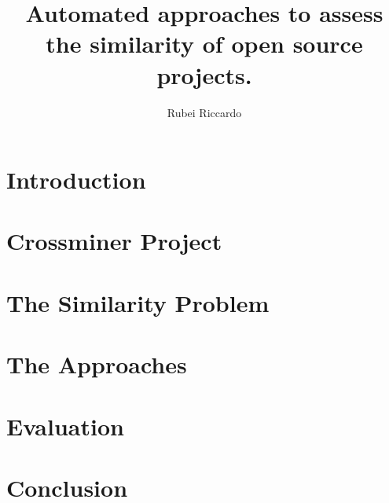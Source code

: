 \documentclass[11pt]{article} %
\title{ Automated approaches to assess the similarity of open source projects. }
\author{Rubei Riccardo}
\begin{document}
\maketitle
\newpage
\tableofcontents
\newpage


		\section{Introduction}
		\label{sec:Introduction}
		
		\clearpage

		\section{Crossminer Project}
		\label{sec:Crossminer Project}
		
		\clearpage

		\section{The Similarity Problem}
		\label{sec:Similarity}
		
		\clearpage

		\section{The Approaches}
		\label{sec:Approaches}
		
		\clearpage

		\section{Evaluation}
		\label{src:Evaluation}
		
		\clearpage

		\section{Conclusion}
		\label{src:Conclusion}
		
		\clearpage

		
		
\end{document}
